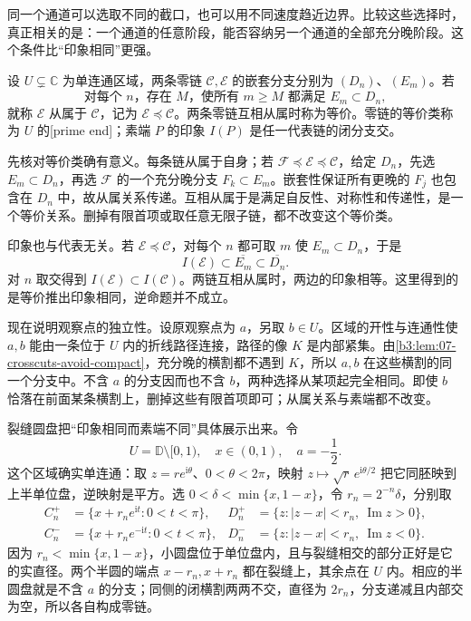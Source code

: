 同一个通道可以选取不同的截口，也可以用不同速度趋近边界。比较这些选择时，真正相关的是：一个通道的任意阶段，能否容纳另一个通道的全部充分晚阶段。这个条件比“印象相同”更强。

\begin{definition}\label{b3:def:07-prime-end}
设 \(U\subsetneq\mathbb C\) 为单连通区域，两条零链 \(\mathcal C,\mathcal E\) 的嵌套分支分别为 \((D_n)\)、\((E_m)\)。若
\[
 \text{对每个 }n\text{，存在 }M\text{，使所有 }m\ge M
 \text{ 都满足 }E_m\subset D_n,
\]
就称 \(\mathcal E\) 从属于 \(\mathcal C\)，记为 \(\mathcal E\preccurlyeq\mathcal C\)。两条零链互相从属时称为等价。零链的等价类称为 \(U\) 的[prime end]；素端 \(P\) 的印象 \(I(P)\) 是任一代表链的闭分支交。
\end{definition}
先核对等价类确有意义。每条链从属于自身；若 \(\mathcal F\preccurlyeq\mathcal E\preccurlyeq\mathcal C\)，给定 \(D_n\)，先选 \(E_m\subset D_n\)，再选 \(\mathcal F\) 的一个充分晚分支 \(F_k\subset E_m\)。嵌套性保证所有更晚的 \(F_j\) 也包含在 \(D_n\) 中，故从属关系传递。互相从属于是满足自反性、对称性和传递性，是一个等价关系。删掉有限首项或取任意无限子链，都不改变这个等价类。

\ProseParagraphBreak
印象也与代表无关。若 \(\mathcal E\preccurlyeq\mathcal C\)，对每个 \(n\) 都可取 \(m\) 使 \(E_m\subset D_n\)，于是
\[
 I(\mathcal E)\subset\overline{E_m}
 \subset\overline{D_n}.
\]
对 \(n\) 取交得到 \(I(\mathcal E)\subset I(\mathcal C)\)。两链互相从属时，两边的印象相等。这里得到的是等价推出印象相同，逆命题并不成立。

\ProseParagraphBreak
现在说明观察点的独立性。设原观察点为 \(a\)，另取 \(b\in U\)。区域的开性与连通性使 \(a,b\) 能由一条位于 \(U\) 内的折线路径连接，路径的像 \(K\) 是内部紧集。由\cref{b3:lem:07-crosscuts-avoid-compact}，充分晚的横割都不遇到 \(K\)，所以 \(a,b\) 在这些横割的同一个分支中。不含 \(a\) 的分支因而也不含 \(b\)，两种选择从某项起完全相同。即使 \(b\) 恰落在前面某条横割上，删掉这些有限首项即可；从属关系与素端都不改变。

\ProseParagraphBreak
裂缝圆盘把“印象相同而素端不同”具体展示出来。令
\[
 U=\mathbb D\setminus[0,1),\quad x\in(0,1),
 \quad a=-\frac12.
\]
这个区域确实单连通：取 \(z=re^{\mathrm i\theta}\)、\(0<\theta<2\pi\)，映射 \(z\mapsto\sqrt r\,e^{\mathrm i\theta/2}\) 把它同胚映到上半单位盘，逆映射是平方。选 \(0<\delta<\min\{x,1-x\}\)，令 \(r_n=2^{-n}\delta\)，分别取
\[
 \begin{aligned}
 C_n^+&=\{x+r_ne^{\mathrm it}:0<t<\pi\},
 &D_n^+&=\{z:|z-x|<r_n,\ \operatorname{Im}z>0\},\\
 C_n^-&=\{x+r_ne^{-\mathrm it}:0<t<\pi\},
 &D_n^-&=\{z:|z-x|<r_n,\ \operatorname{Im}z<0\}.
 \end{aligned}
\]
因为 \(r_n<\min\{x,1-x\}\)，小圆盘位于单位盘内，且与裂缝相交的部分正好是它的实直径。两个半圆的端点 \(x-r_n,x+r_n\) 都在裂缝上，其余点在 \(U\) 内。相应的半圆盘就是不含 \(a\) 的分支；同侧的闭横割两两不交，直径为 \(2r_n\)，分支递减且内部交为空，所以各自构成零链。

